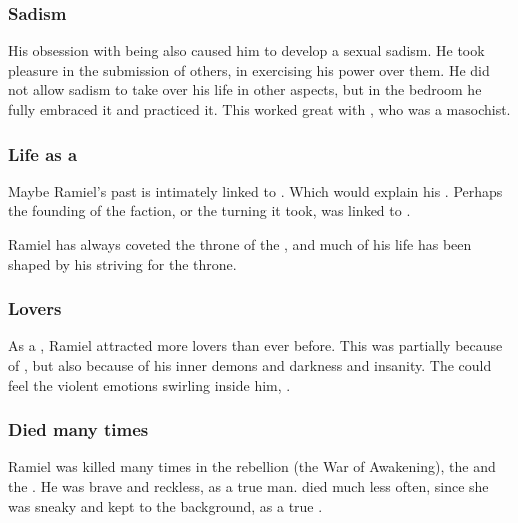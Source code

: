\subsubsection{Sadism}
His obsession with being  also caused him to develop a sexual sadism. 
He took pleasure in the submission of others, in exercising his power over them. 
He did not allow sadism to take over his life in other aspects, but in the bedroom he fully embraced it and practiced it. 
This worked great with \Shiaraid, who was a masochist.






\subsubsection{Life as a \sathariah}
Maybe Ramiel's past is intimately linked to \Cuezca. 
Which would explain his . 
Perhaps the founding of the \Mystraacht{} faction, or the turning it took, was linked to \Cuezca. 

Ramiel has always coveted the throne of the \Mystraacht{} \apex{}, and much of his life has been shaped by his striving for the throne. 





\subsubsection{Lovers}
As a \sathariah, Ramiel attracted more \resvil lovers than ever before.
This was partially because of , but also because of his inner demons and darkness and insanity.
The \resviel could feel the violent emotions swirling inside him, .






\subsubsection{Died many times}
Ramiel was killed many times in the rebellion (the War of Awakening), the \secondbanewar and the \resphanwars. 
He was brave and reckless, as a true \resphan man.
\Shiaraid died much less often, since she was sneaky and kept to the background, as a true \resvil.






